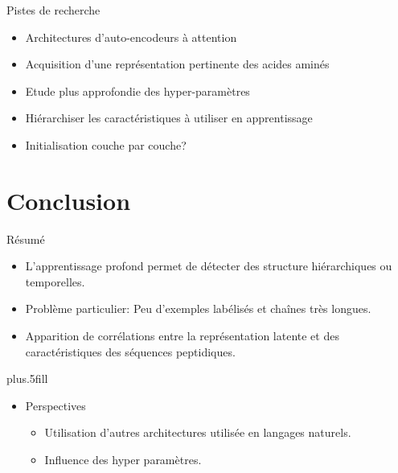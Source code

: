 \documentclass{beamer}
\begin{document}
\begin{frame}{Pistes de recherche}

    \begin{itemize}
    \item Architectures d'auto-encodeurs à attention\pause
    \item Acquisition d'une représentation pertinente des acides aminés\pause
    \item Etude plus approfondie des hyper-paramètres\pause
    \item Hiérarchiser les caractéristiques à utiliser en apprentissage\pause
    \item Initialisation couche par couche?
    \end{itemize}
 \end{frame}


\section*{Conclusion}

\begin{frame}{Résumé}

  \begin{itemize}
  \item
    L'apprentissage profond permet de \alert{détecter des structure
      hiérarchiques ou temporelles}.\pause
  \item
    Problème particulier: Peu \alert{d'exemples labélisés} et \alert{chaînes très longues}.\pause
  \item
    Apparition de \alert{corrélations} entre la représentation latente et des
    caractéristiques des séquences peptidiques.\pause
  \end{itemize}
  
  \vskip0pt plus.5fill
  \begin{itemize}
  \item
    Perspectives\pause
    \begin{itemize}
    \item
      Utilisation d'autres architectures utilisée en langages naturels.\pause
    \item
      Influence des hyper paramètres.
    \end{itemize}
  \end{itemize}
\end{frame}
\end{document}
